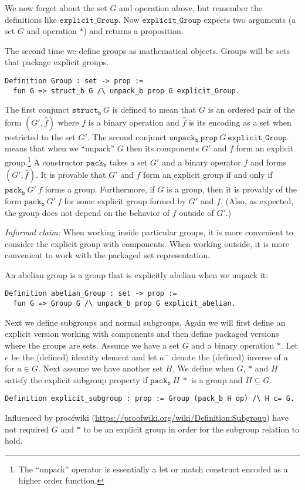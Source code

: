 \documentclass{article}
\begin{document}
We now forget about the set $G$ and operation above, but
remember the definitions like ${\mathtt{explicit\_Group}}$.
Now ${\mathtt{explicit\_Group}}$ expects two arguments (a set $G$ and operation $*$) and
returns a proposition.

The second time we define groups as mathematical objects.
Groups will be sets that package explicit groups.
\begin{verbatim}
Definition Group : set -> prop :=
  fun G => struct_b G /\ unpack_b prop G explicit_Group.
\end{verbatim}
The first conjunct $\mathtt{struct_b}~G$ is defined to mean
that $G$ is an ordered pair of the form $(G',\hat{f})$ where $f$ is a
binary operation and $\hat{f}$ is its encoding as a set when restricted to the set $G'$.
The second conjunct $\mathtt{unpack_b}~\mathtt{prop}~G~\mathtt{explicit\_Group}$.
means that when we ``unpack'' $G$ then its components $G'$ and $f$
form an explicit group.\footnote{The ``unpack'' operator is essentially a let or match construct encoded as a higher order function.}
A constructor $\mathtt{pack_b}$ takes a set $G'$ and a binary operator $f$ and forms $(G',\hat{f})$.
It is provable that $G'$ and $f$ form an explicit group if and only if $\mathtt{pack_b}~G'~f$
forms a group. Furthermore, if $G$ is a group, then it is provably of the form $\mathtt{pack_b}~G'~f$
for some explicit group formed by $G'$ and $f$. (Also, as expected, the group does not depend on the
behavior of $f$ outside of $G'$.)

{\it{Informal claim:}} When working inside particular groups, it is
more convenient to consider the explicit group with components. When
working outside, it is more convenient to work with the packaged set
representation.

An abelian group is a group that is explicitly abelian when we unpack it:
\begin{verbatim}
Definition abelian_Group : set -> prop :=
  fun G => Group G /\ unpack_b prop G explicit_abelian.
\end{verbatim}

Next we define subgroups and normal subgroups. Again we will first define an explicit version
working with components and then define packaged versions where the groups are sets.
Assume we have a set $G$ and a binary operation $*$.
Let $e$ be the (defined) identity element and let $a^-$ denote the (defined) inverse of $a$
for $a\in G$.
Next assume we have another set $H$. We define when $G$, $*$ and $H$ satisfy the explicit subgroup property
if $\mathtt{pack_b}~H~*$ is a group and $H\subseteq G$.
\begin{verbatim}
Definition explicit_subgroup : prop := Group (pack_b H op) /\ H c= G.
\end{verbatim}
Influenced by proofwiki (\url{https://proofwiki.org/wiki/Definition:Subgroup}) have not required $G$ and $*$ to be an
explicit group in order for the subgroup relation to hold.
\end{document}
